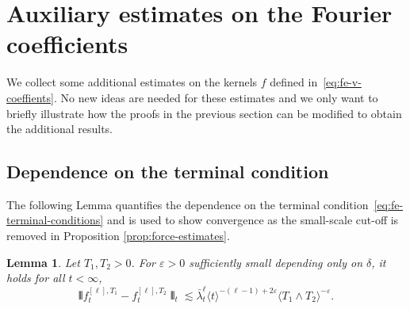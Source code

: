 \documentclass[11pt, a4paper]{scrartcl}
\numberwithin{equation}{section}
\theoremstyle{plain}
\newtheorem{lemma}[foo]{Lemma}
\theoremstyle{remark}
\begin{document}
\section{Auxiliary estimates on the Fourier coefficients}
We collect some additional estimates on the kernels $f$ defined
in~\eqref{eq:fe-v-coeffients}. No new ideas are needed for these estimates and
we only want to briefly illustrate how the proofs in the previous section can
be modified to obtain the additional results.

\subsection{Dependence on the terminal condition}

The following Lemma quantifies the dependence on the terminal
condition~\eqref{eq:fe-terminal-conditions} and is used to show convergence as
the small-scale cut-off is removed in Proposition \ref{prop:force-estimates}.

\begin{lemma}
	\label{lem:coeff-T-dependence}Let $T_1,T_2>0$. For $\varepsilon>0$ sufficiently small
	depending only on $\delta$, it holds for all $t < \infty$,
	\begin{equation}
		\interleave f^{[\ell], T_1}_t - f_t^{[\ell], T_2} \interleave_t \lesssim
		\bar{\lambda}_t^{\ell} \langle t\rangle^{- (\ell - 1) + 2 \varepsilon} \langle T_1 \wedge T_2
		\rangle^{- \varepsilon} . \label{eq:coeff-T-dependence}
	\end{equation}
\end{lemma}
\end{document}
